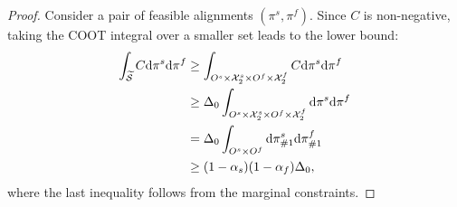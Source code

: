 \begin{proof}
Consider a pair of feasible alignments $(\pi^s, \pi^f)$. Since $C$ is non-negative, taking the COOT integral over a smaller set leads to the lower bound:
\begin{equation}
    \begin{split}
        \int_{\widetilde{\mathcal S}} C \mathrm d\pi^s\mathrm d\pi^f
        &\geq \int_{O^s \times \mathcal X_2^s \times O^f \times \mathcal X_2^f} C \mathrm d\pi^s\mathrm d\pi^f \\
          &\geq  \Delta_0 \int_{O^s \times \mathcal X_2^s \times O^f \times \mathcal X_2^f}  \mathrm d\pi^s\mathrm d\pi^f \\
          &= \Delta_0 \int_{O^s\times O^f}  \mathrm d\pi^s_{\#1} \mathrm d\pi^f_{\#1} \\
          &\geq (1 - \alpha_s)(1 -\alpha_f)\Delta_0,
    \end{split}
\end{equation}
where the last inequality follows from the marginal constraints.
\end{proof}

